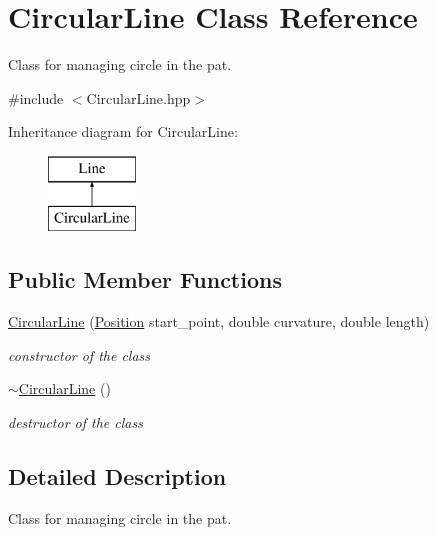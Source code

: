 \hypertarget{class_circular_line}{}\section{Circular\+Line Class Reference}
\label{class_circular_line}


Class for managing circle in the pat.  




{\ttfamily \#include $<$Circular\+Line.\+hpp$>$}

Inheritance diagram for Circular\+Line\+:\begin{figure}[H]
\begin{center}
\leavevmode
\includegraphics[height=2.000000cm]{class_circular_line}
\end{center}
\end{figure}
\subsection*{Public Member Functions}
\begin{DoxyCompactItemize}
\item 
\mbox{\hyperlink{class_circular_line_aacb17f31ed3eb9fbe66fbe2a95b20e6a}{Circular\+Line}} (\mbox{\hyperlink{class_position}{Position}} start\+\_\+point, double curvature, double length)
\begin{DoxyCompactList}\small\item\em constructor of the class \end{DoxyCompactList}\item 
\mbox{\label{class_circular_line_a2f8c59281cb51a6072b6980b6df9be89}} 
\mbox{\hyperlink{class_circular_line_a2f8c59281cb51a6072b6980b6df9be89}{$\sim$\+Circular\+Line}} ()
\begin{DoxyCompactList}\small\item\em destructor of the class \end{DoxyCompactList}\end{DoxyCompactItemize}


\subsection{Detailed Description}
Class for managing circle in the pat. 

